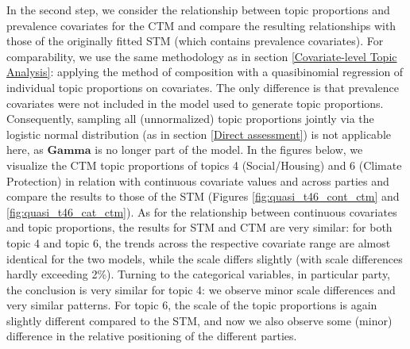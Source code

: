 In the second step, we consider the relationship between topic proportions and prevalence covariates for the CTM and compare the resulting relationships with those of the originally fitted STM (which contains prevalence covariates). For comparability, we use the same methodology as in section \ref{Covariate-level Topic Analysis}: applying the method of composition with a quasibinomial regression of individual topic proportions on covariates. The only difference is that prevalence covariates were not included in the model used to generate topic proportions. Consequently, sampling all (unnormalized) topic proportions jointly via the logistic normal distribution (as in section \ref{Direct assessment}) is not applicable here, as $\boldsymbol{Gamma}$ is no longer part of the model. In the figures below, we visualize the CTM topic proportions of topics 4 (Social/Housing) and 6 (Climate Protection) in relation with continuous covariate values and across parties and compare the results to those of the STM (Figures \ref{fig:quasi_t46_cont_ctm} and \ref{fig:quasi_t46_cat_ctm}). As for the relationship between continuous covariates and topic proportions, the results for STM and CTM are very similar: for both topic 4 and topic 6, the trends across the respective covariate range are almost identical for the two models, while the scale differs slightly (with scale differences hardly exceeding 2\%). Turning to the categorical variables, in particular party, the conclusion is very similar for topic 4: we observe minor scale differences and very similar patterns. For topic 6, the scale of the topic proportions is again slightly different compared to the STM, and now we also observe some (minor) difference in the relative positioning of the different parties. 

